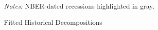 \begin{figure}[ht]
    \centering
    \caption{Fitted Historical Decompositions}
    

    {\scriptsize \emph{Notes:} NBER-dated recessions highlighted in gray.}
    \label{fig:fit-hist-decomp}
\end{figure}
